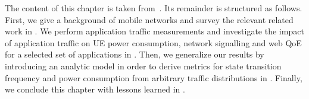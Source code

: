 The content of this chapter is taken from~\cite{Schwartz2013a,Schwartz2013c}.
Its remainder is structured as follows.
First, we give a background of mobile networks and survey the relevant related work in .
We perform application traffic measurements and investigate the impact of application traffic on \gls{UE} power consumption, network signalling and web \gls{QoE} for a selected set of applications in .
Then, we generalize our results by introducing an analytic model in order to derive metrics for state transition frequency and power consumption from arbitrary traffic distributions in .
Finally, we conclude this chapter with lessons learned in .






